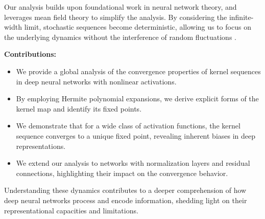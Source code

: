 \documentclass[twoside]{article}
\theoremstyle{definition}
\begin{document}
Our analysis builds upon foundational work in neural network theory, and leverages mean field theory to simplify the analysis. By considering the infinite-width limit, stochastic sequences become deterministic, allowing us to focus on the underlying dynamics without the interference of random fluctuations \citep{poole2016exponential, yang2019meanfield, mei2019mean}.

\textbf{Contributions:} 
\begin{itemize}
    \item We provide a global analysis of the convergence properties of kernel sequences in deep neural networks with nonlinear activations.
    \item By employing Hermite polynomial expansions, we derive explicit forms of the kernel map and identify its fixed points.
    \item We demonstrate that for a wide class of activation functions, the kernel sequence converges to a unique fixed point, revealing inherent biases in deep representations.
    \item We extend our analysis to networks with normalization layers and residual connections, highlighting their impact on the convergence behavior.
\end{itemize}

Understanding these dynamics contributes to a deeper comprehension of how deep neural networks process and encode information, shedding light on their representational capacities and limitations.

\end{document}
